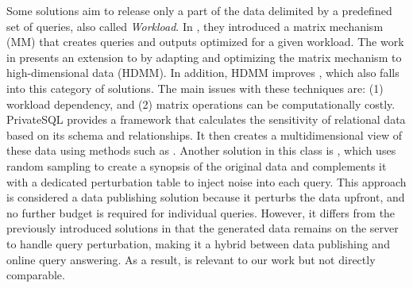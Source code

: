 \medskip

Some solutions aim to release only a part of the data delimited by a predefined set of queries, also called \textit{Workload}. In \cite{mm}, they introduced a matrix mechanism (MM) that creates queries and outputs optimized for a given workload. The work in \cite{hdmm} presents an extension to \cite{mm} by adapting and optimizing the matrix mechanism to high-dimensional data (HDMM). 
In addition, HDMM improves \cite{dawa}, which also falls into this category of solutions. 
The main issues with these techniques are: (1) workload dependency, and (2) matrix operations can be computationally costly.
PrivateSQL \cite{privatesql} provides a framework that calculates the sensitivity of relational data based on its schema and relationships. It then creates a multidimensional view of these data using methods such as \cite{dawa,mm}.
Another solution in this class is \cite{slimview}, which uses random sampling to create a synopsis of the original data and complements it with a dedicated perturbation table to inject noise into each query. This approach is considered a data publishing solution because it perturbs the data upfront, and no further budget is required for individual queries. However, it differs from the previously introduced solutions in that the generated data remains on the server to handle query perturbation, making it a hybrid between data publishing and online query answering. As a result, \cite{slimview} is relevant to our work but not directly comparable.
\medskip

